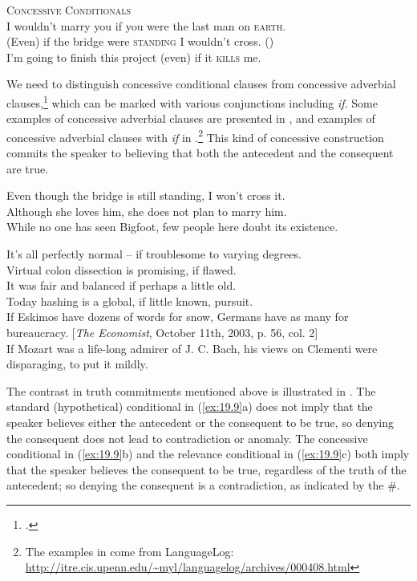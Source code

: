 \ea \label{ex:19.6}
\textsc{Concessive Conditionals}\\
\ea  I wouldn’t marry you if you were the last man on \textsc{earth}. \\
\ex (Even) if the bridge were \textsc{standing} I wouldn’t cross. (\citealt{Bennett1982})\\
\ex I’m going to finish this project (even) if it \textsc{kills} me.
                       \z
\z


We need to distinguish concessive conditional clauses from concessive adverbial clauses,\footnote{\citet{ThompsonEtAl2007}.} which can be marked with various conjunctions including \textit{if}. Some examples of concessive adverbial clauses are presented in , and examples of concessive adverbial clauses with \textit{if} in .\footnote{The examples in  come from LanguageLog: \url{http://itre.cis.upenn.edu/~myl/languagelog/archives/000408.html}}  This kind of concessive construction commits the speaker to believing that both the antecedent and the consequent are true.


\ea \label{ex:19.7}
\ea  Even though the bridge is still standing, I won’t cross it.\\
\ex Although she loves him, she does not plan to marry him.\\
\ex While no one has seen Bigfoot, few people here doubt its existence.
                       \z
\z

\ea \label{ex:19.8}
\ea  It’s all perfectly normal – if troublesome to varying degrees.\\
\ex Virtual colon dissection is promising, if flawed.\\
\ex It was fair and balanced if perhaps a little old.\\
\ex Today hashing is a global, if little known, pursuit.\\
\ex If Eskimos have dozens of words for snow, Germans have as many for\\
  bureaucracy. [\textit{The Economist}, October 11th, 2003, p. 56, col. 2]\\
\ex If Mozart was a life-long admirer of J. C. Bach, his views on Clementi were disparaging, to put it mildly. 
                       \z
\z


The contrast in truth commitments mentioned above is illustrated in . The standard (hypothetical) conditional in (\ref{ex:19.9}a) does not imply that the speaker believes either the antecedent or the consequent to be true, so denying the consequent does not lead to contradiction or anomaly. The concessive conditional in (\ref{ex:19.9}b) and the relevance conditional in (\ref{ex:19.9}c) both imply that the speaker believes the consequent to be true, regardless of the truth of the antecedent; so denying the consequent is a contradiction, as indicated by the \#.



